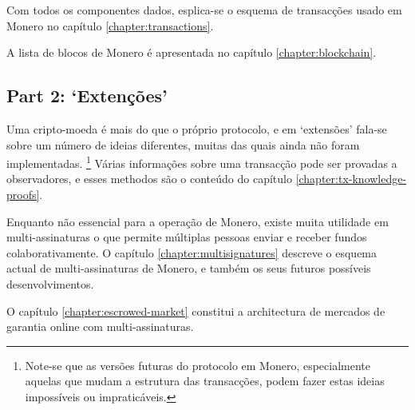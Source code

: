 Com todos os componentes dados, esplica-se o esquema de transacções usado em Monero no capítulo \ref{chapter:transactions}.

A lista de blocos de Monero é apresentada no capítulo \ref{chapter:blockchain}.


\subsection{Part 2: `Extenções'}

Uma cripto-moeda é mais do que o próprio protocolo, e em `extensões' fala-se sobre um número de ideias diferentes, muitas das quais ainda não foram implementadas. 
\footnote{Note-se que as versões futuras do protocolo em Monero, especialmente aquelas que mudam a estrutura das transacções, podem fazer estas ideias impossíveis ou impraticáveis.}
Várias informações sobre uma transacção pode ser provadas a observadores, e esses methodos são o conteúdo do capítulo \ref{chapter:tx-knowledge-proofs}.

Enquanto não essencial para a operação de Monero, existe muita utilidade em multi-assinaturas o que permite múltiplas pessoas enviar e receber fundos colaborativamente.
O capítulo \ref{chapter:multisignatures} descreve o esquema actual de multi-assinaturas de Monero, e também os seus futuros possíveis desenvolvimentos.

O capítulo \ref{chapter:escrowed-market} constitui a architectura de mercados de garantia online com multi-assinaturas.  


